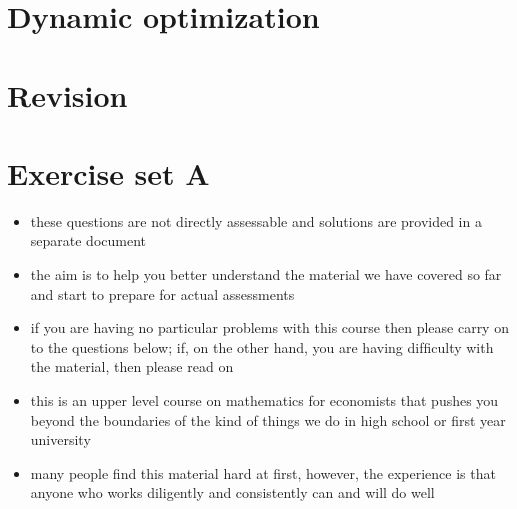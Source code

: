 \documentclass[letterpaper,10pt,english]{jupyterBook}
\begin{document}
\sphinxstepscope


\chapter{Dynamic optimization}
\label{\detokenize{11.dynamic:dynamic-optimization}}\label{\detokenize{11.dynamic::doc}}

\sphinxstepscope


\chapter{Revision}
\label{\detokenize{12.revision:revision}}\label{\detokenize{12.revision::doc}}

\sphinxstepscope


\chapter{Exercise set A}
\label{\detokenize{02.exercises:exercise-set-a}}\label{\detokenize{02.exercises::doc}}
\sphinxAtStartPar
{}
\begin{itemize}
\item {} 
\sphinxAtStartPar
these questions are not directly assessable and solutions are provided in a separate document

\item {} 
\sphinxAtStartPar
the aim is to help you better understand the material we have covered so far and start to prepare for actual assessments

\item {} 
\sphinxAtStartPar
if you are having no particular problems with this course then
please carry on to the questions below; if, on the other hand, you are having difﬁculty with the material, then please read on

\item {} 
\sphinxAtStartPar
this is an upper level course on mathematics for economists that pushes you beyond the boundaries of the kind of things we do in high school or ﬁrst year university

\item {} 
\sphinxAtStartPar
many people ﬁnd this material hard at ﬁrst, however, the experience is that anyone who works diligently and consistently can and will do well

\end{itemize}
\end{document}
